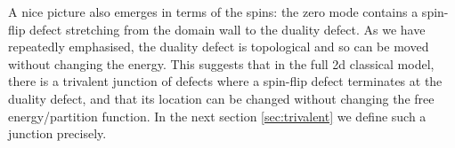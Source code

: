\documentclass[11pt]{article}
\numberwithin{equation}{section}		%
\begin{document}
A nice picture also emerges in terms of the spins: the zero mode contains a spin-flip defect stretching from the domain wall to the duality defect. As we have repeatedly emphasised, the duality defect is topological and so can be moved without changing the energy. This suggests that in the full 2d classical model, there is a trivalent junction of defects where a spin-flip defect terminates at the duality defect, and that its location can be changed without changing the free energy/partition function. In the next section \ref{sec:trivalent} we define such a junction precisely.







\end{document}
